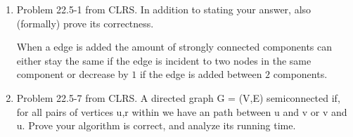 \documentclass[letterpaper,11pt]{article}
\begin{document}
\begin{enumerate}
\item Problem 22.5-1 from CLRS. In addition to stating your answer, also (formally) prove its correctness.

When a edge is added the amount of strongly connected components can either stay the same if the edge is incident to two nodes in the same component or decrease by $1$ if the edge is added between $2$ components.
 
\item Problem 22.5-7 from CLRS.
A directed graph G = (V,E) semiconnected if, for all pairs of vertices u,r within we have an path between u and v or v and u. Prove your algorithm is correct, and analyze its running time.
\begin{algorithm}
\begin{algorithmic}[1]
\State 
\EndFunction
\end{algorithmic}
\end{algorithm}

\end{enumerate}
\end{document}
